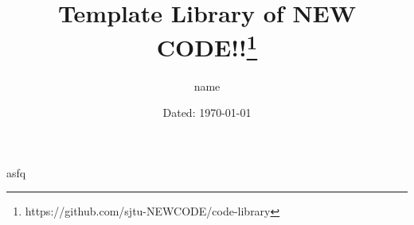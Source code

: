 \documentclass[UTF8,a4paper,openany]{book}
\title{Template Library of NEW CODE!!\thanks{https://github.com/sjtu-NEWCODE/code-library}}
\author{name}
\date{Dated: \today}
\begin{document}
	\maketitle
	\twocolumn[]
	asfq
	
\end{document}
